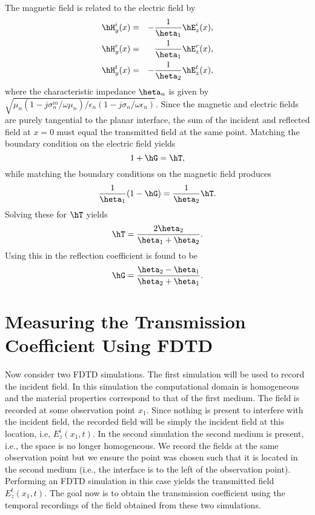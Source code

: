 The magnetic field is related to the electric field by
\begin{eqnarray}
  \hH_y^i(x) &=& -\frac{1}{\heta_1}\hE_z^i(x), \\ 
  \hH_y^r(x) &=& \frac{1}{\heta_1}\hE_z^r(x), \\ 
  \hH_y^t(x) &=& -\frac{1}{\heta_2}\hE_z^t(x),
\end{eqnarray}
where the characteristic impedance $\heta_n$ is given by
$\sqrt{\mu_n(1-j\sigma^m_n/\omega\mu_n)/
  \epsilon_n(1-j\sigma_n/\omega\epsilon_n)}$.  Since the magnetic and
electric fields are purely tangential to the planar interface, the sum
of the incident and reflected field at $x=0$ must equal the
transmitted field at the same point.  Matching the boundary condition
on the electric field yields
\begin{equation}
  1 + \hG = \hT,
  \label{eq:matchingFields}
\end{equation}
while matching the boundary conditions on the magnetic field produces
\begin{equation}
 \frac{1}{\heta_1}(1 - \hG) = \frac{1}{\heta_2}\hT.
\end{equation}
Solving these for $\hT$ yields
\begin{equation}
  \hT = \frac{2\heta_2}{\heta_1+\heta_2}.
  \label{eq:transCoefSpectral}
\end{equation}
Using this in  the reflection coefficient is
found to be
\begin{equation}
  \hG = \frac{\heta_2-\heta_1}{\heta_2+\heta_1}.
  \label{eq:refCoefSpectral}
\end{equation}

\section{Measuring the Transmission Coefficient Using FDTD
\label{sec:measureTrans}}

Now consider two FDTD simulations.  The first simulation will be used
to record the incident field.  In this simulation the computational
domain is homogeneous and the material properties correspond to that
of the first medium.  The field is recorded at some observation point
$x_1$.  Since nothing is present to interfere with the incident field,
the recorded field will be simply the incident field at this location,
i.e, $E_z^i(x_1,t)$.  In the second simulation the second medium is
present, i.e., the space is no longer homogeneous.  We record the
fields at the same observation point but we ensure the point was
chosen such that it is located in the second medium (i.e., the
interface is to the left of the observation point).  Performing an
FDTD simulation in this case yields the transmitted field
$E_z^t(x_1,t)$.  The goal now is to obtain the transmission
coefficient using the temporal recordings of the field obtained from
these two simulations.

